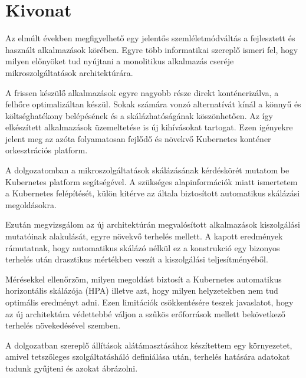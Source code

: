 \setcounter{page}{1}

\selecthungarian

\chapter*{Kivonat}

Az elmúlt években megfigyelhető egy jelentős szemléletmódváltás a fejlesztett és használt alkalmazások körében.%
Egyre több informatikai szereplő ismeri fel, hogy milyen előnyöket tud nyújtani a monolitikus alkalmazás cseréje mikroszolgáltatások architektúrára.

A frissen készülő alkalmazások egyre nagyobb része direkt konténerizálva, a felhőre optimalizáltan készül.
Sokak számára vonzó alternatívát kínál a könnyű és költséghatékony belépésének és a skálázhatóságának köszönhetően.
Az így elkészített alkalmazások üzemeltetése  is új kihívásokat tartogat.
Ezen igényekre jelent meg az azóta folyamatosan fejlődő és növekvő Kubernetes konténer orkesztrációs platform.

A dolgozatomban a mikroszolgáltatások skálázásának kérdéskörét mutatom be Kubernetes platform segítségével.
A szükséges alapinformációk miatt ismertetem a Kubernetes felépítését, külön kitérve az általa biztosított automatikus skálázási megoldásokra.

Ezután megvizsgálom az új architektúrán megvalósított alkalmazások kiszolgálási mutatóinak alakulását, egyre növekvő terhelés mellett.
A kapott eredmények rámutatnak, hogy automatikus skálázó nélkül ez a konstrukció egy bizonyos terhelés után drasztikus mértékben veszít a kiszolgálási teljesítményéből.

Mérésekkel ellenőrzöm, milyen megoldást biztosít a Kubernetes automatikus horizontális skálázója (HPA) illetve azt, hogy milyen helyzetekben nem tud optimális eredményt adni.
Ezen limitációk csökkentésére teszek javaslatot, hogy az új architektúra védettebbé váljon a szűkös erőforrások mellett bekövetkező terhelés növekedésével szemben.

A dolgozatban szereplő állítások alátámasztásához készítettem egy környezetet, amivel tetszőleges szolgáltatásháló definiálása után, terhelés hatására adatokat tudunk gyűjteni és azokat ábrázolni.

